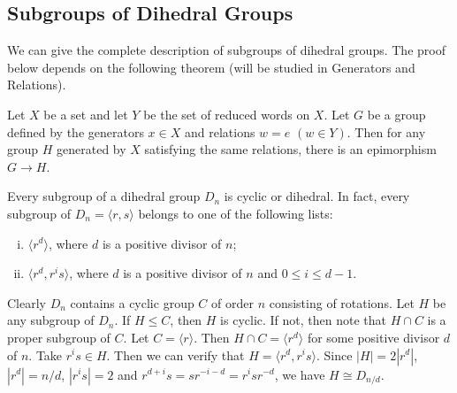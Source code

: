 \subsection{Subgroups of Dihedral Groups}
We can give the complete description of subgroups of dihedral groups. The proof below depends on the following theorem (will be studied in Generators and Relations).
\begin{theorem} \label{thm-Van-Dyck}
	Let $X$ be a set and let $Y$ be the set of reduced words on $X$.
	Let $G$ be a group defined by the generators $x\in X$ and relations $w = e$ $(w\in Y)$. Then for any group $H$ generated by $X$ satisfying the same relations, there is an epimorphism $G\rightarrow H$. 
\end{theorem}

\begin{theorem} \label{thm-subgrp-of-Dn}
	 Every subgroup of a dihedral group $D_{n}$ is cyclic or dihedral. In fact, every subgroup of $D_n = \langle r,s\rangle$ belongs to one of the following lists:
	 \begin{enumerate}[(i)]
	 	\item $\langle r^d \rangle$, where $d$ is a positive divisor of $n$;
	 	\item $\langle r^d, r^is\rangle$, where $d$ is a positive divisor of $n$ and $0\leq i\leq d-1$.
	 \end{enumerate}
\end{theorem}
\begin{sketch}
	Clearly $D_n$ contains a cyclic group $C$ of order $n$ consisting of rotations.  Let $H$ be any subgroup of $D_n$. If $H  \leq C$,
	then $H$ is cyclic. If not, then note that $H \cap C$ is a proper subgroup of $C$. Let $C = \langle r\rangle$. Then $H\cap C = \langle r^d\rangle$ for some positive divisor $d$ of $n$. Take $r^i s\in H$. Then we can verify that $H = \langle r^d, r^is \rangle$. Since $|H| = 2|r^d|$,   $|r^d| = n/d$, $|r^i s| = 2$ and $r^{d+i}s = sr^{-i-d} = r^{i}sr^{-d}$, we have   $H\cong D_{n/d}$.
\end{sketch}

